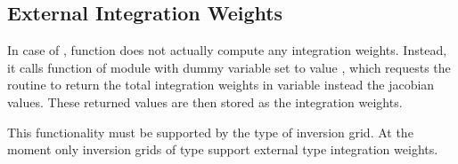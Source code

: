 \subsection{External Integration Weights} \label{programs_scripts,sec:fmod_intw,sec:external}
%
In case of , function  does not actually compute
any integration weights. Instead, it calls function  of module 
 with dummy variable  set to value , which 
requests the routine to return the total integration weights in variable  instead the 
jacobian values. These returned values are then stored as the integration weights.

This functionality must be supported by the type of inversion grid. At the moment only inversion grids 
of type  support external type integration weights.
%      
